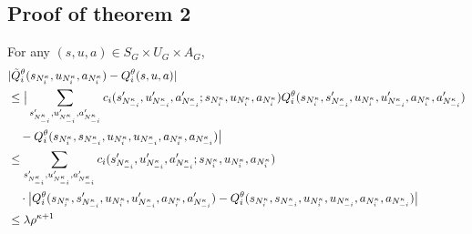 \documentclass[conf]{new-aiaa}
\begin{document}
\subsection{Proof of theorem 2}
For any $(s, u, a) \in S_G \times U_G \times A_G$,
\begin{equation}
\begin{aligned}
    & |\Tilde{Q}_i^\theta(s_{N_i^\kappa}, u_{N_i^\kappa}, a_{N_i^\kappa})-Q_i^\theta(s, u,a)| \\
    & \le \big|\sum_{s_{N_{-i}^\kappa}', u_{N_{-i}^\kappa}', a_{N_{-i}^\kappa}'}
    c_i(s_{N_{-i}^\kappa}',u_{N_{-i}^\kappa}',a_{N_{-i}^\kappa}'; s_{N_i^\kappa},u_{N_i^\kappa},a_{N_i^\kappa})  Q_i^\theta(s_{N_i^\kappa},s_{N_{-i}^\kappa}',u_{N_i^\kappa},u_{N_{-i}^\kappa}', a_{N_i^\kappa},a_{N_{-i}^\kappa}') \\
    &\quad - Q_i^\theta(s_{N_i^\kappa},s_{N_{-i}^\kappa},u_{N_i^\kappa},u_{N_{-i}^\kappa}, a_{N_i^\kappa},a_{N_{-i}^\kappa}) \big| \\
    & \le  \sum_{s_{N_{-i}^\kappa}', u_{N_{-i}^\kappa}', a_{N_{-i}^\kappa}'}
    c_i(s_{N_{-i}^\kappa}',u_{N_{-i}^\kappa}',a_{N_{-i}^\kappa}'; s_{N_i^\kappa},u_{N_i^\kappa},a_{N_i^\kappa}) \\
    &  \quad \cdot \big |Q_i^\theta(s_{N_i^\kappa},s_{N_{-i}^\kappa}',u_{N_i^\kappa},u_{N_{-i}^\kappa}', a_{N_i^\kappa},a_{N_{-i}^\kappa}')  - Q_i^\theta(s_{N_i^\kappa},s_{N_{-i}^\kappa},u_{N_i^\kappa},u_{N_{-i}^\kappa}, a_{N_i^\kappa},a_{N_{-i}^\kappa}) \big | \\
    & \le \lambda \rho^{\kappa+1}
\end{aligned}
\end{equation}

\end{document}

